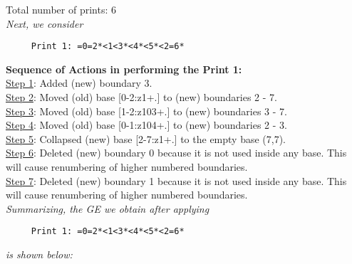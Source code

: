 \documentclass[final]{article}
\begin{document}
Total number of prints: 6\\
{\em Next, we consider}
\begin{verbatim}
     Print 1: =0=2*<1<3*<4*<5*<2=6*
\end{verbatim}
{\bf Sequence of Actions in performing the Print 1:}\\
{\underline{Step 1}:} Added (new) boundary 3.\\
{\underline{Step 2}:} Moved (old) base [0-2:z1+.]  to (new) boundaries 2 - 7.\\
{\underline{Step 3}:} Moved (old) base [1-2:z103+.]  to (new) boundaries 3 - 7.\\
{\underline{Step 4}:} Moved (old) base [0-1:z104+.]  to (new) boundaries 2 - 3.\\
{\underline{Step 5}:} Collapsed (new) base [2-7:z1+.]  to the empty base (7,7).
\\
{\underline{Step 6}:} Deleted (new) boundary 0 because it is not used inside any base.  This will cause renumbering of higher numbered boundaries.
\\
{\underline{Step 7}:} Deleted (new) boundary 1 because it is not used inside any base.  This will cause renumbering of higher numbered boundaries.
\\[0.1in]
{\em Summarizing, the GE we obtain after applying}
\begin{verbatim}
     Print 1: =0=2*<1<3*<4*<5*<2=6*
\end{verbatim}
{\em is shown below:}
\end{document}
